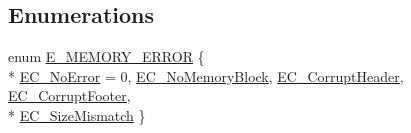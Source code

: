 \subsection*{Enumerations}
\begin{DoxyCompactItemize}
\item 
enum \hyperlink{tracked__memory_8h_adc7040deea27628dba424c534b71dbbf}{E\-\_\-\-M\-E\-M\-O\-R\-Y\-\_\-\-E\-R\-R\-O\-R} \{ \\*
\hyperlink{tracked__memory_8h_adc7040deea27628dba424c534b71dbbfa0bb40faa20ee2383cd4071a19e6756ee}{E\-C\-\_\-\-No\-Error} = 0, 
\hyperlink{tracked__memory_8h_adc7040deea27628dba424c534b71dbbfaaacd8ad060ec70bc74896b8f3375bfff}{E\-C\-\_\-\-No\-Memory\-Block}, 
\hyperlink{tracked__memory_8h_adc7040deea27628dba424c534b71dbbfabb546aef3131ea5f3da84fd374da1f45}{E\-C\-\_\-\-Corrupt\-Header}, 
\hyperlink{tracked__memory_8h_adc7040deea27628dba424c534b71dbbfac73a2ab817ee9057c110c277e1580317}{E\-C\-\_\-\-Corrupt\-Footer}, 
\\*
\hyperlink{tracked__memory_8h_adc7040deea27628dba424c534b71dbbfad493ed6f6910767ac848c9ebcc55c518}{E\-C\-\_\-\-Size\-Mismatch}
 \}
\end{DoxyCompactItemize}
